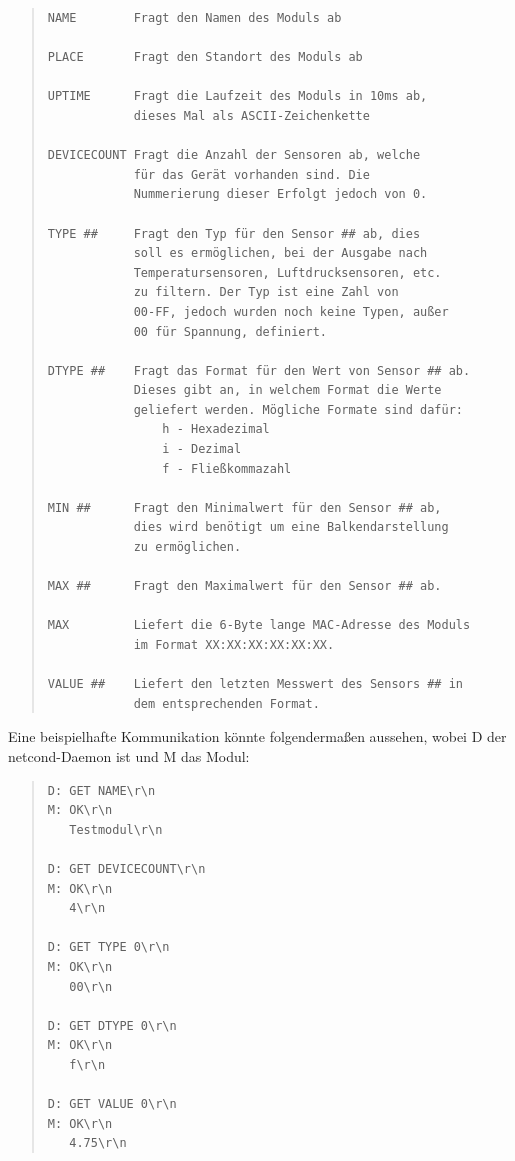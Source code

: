 \documentclass[a4paper,14pt,headsepline]{scrartcl}
\begin{document}
\begin{quote}
\begin{verbatim}
NAME        Fragt den Namen des Moduls ab

PLACE       Fragt den Standort des Moduls ab

UPTIME      Fragt die Laufzeit des Moduls in 10ms ab,
            dieses Mal als ASCII-Zeichenkette
            
DEVICECOUNT Fragt die Anzahl der Sensoren ab, welche
            für das Gerät vorhanden sind. Die
            Nummerierung dieser Erfolgt jedoch von 0.

TYPE ##     Fragt den Typ für den Sensor ## ab, dies 
            soll es ermöglichen, bei der Ausgabe nach
            Temperatursensoren, Luftdrucksensoren, etc.
            zu filtern. Der Typ ist eine Zahl von
            00-FF, jedoch wurden noch keine Typen, außer
            00 für Spannung, definiert.
            
DTYPE ##    Fragt das Format für den Wert von Sensor ## ab.
            Dieses gibt an, in welchem Format die Werte
            geliefert werden. Mögliche Formate sind dafür:
                h - Hexadezimal
                i - Dezimal
                f - Fließkommazahl
                
MIN ##      Fragt den Minimalwert für den Sensor ## ab,
            dies wird benötigt um eine Balkendarstellung
            zu ermöglichen.
            
MAX ##      Fragt den Maximalwert für den Sensor ## ab.

MAX         Liefert die 6-Byte lange MAC-Adresse des Moduls
            im Format XX:XX:XX:XX:XX:XX.
            
VALUE ##    Liefert den letzten Messwert des Sensors ## in
            dem entsprechenden Format.
\end{verbatim}
\end{quote}
Eine beispielhafte Kommunikation könnte folgendermaßen aussehen, wobei D der netcond-Daemon ist und M das Modul:
\begin{quote}
\begin{verbatim}
D: GET NAME\r\n
M: OK\r\n
   Testmodul\r\n
   
D: GET DEVICECOUNT\r\n
M: OK\r\n
   4\r\n
   
D: GET TYPE 0\r\n
M: OK\r\n
   00\r\n
   
D: GET DTYPE 0\r\n
M: OK\r\n
   f\r\n
   
D: GET VALUE 0\r\n
M: OK\r\n
   4.75\r\n
\end{verbatim}
\end{quote}
\end{document}
